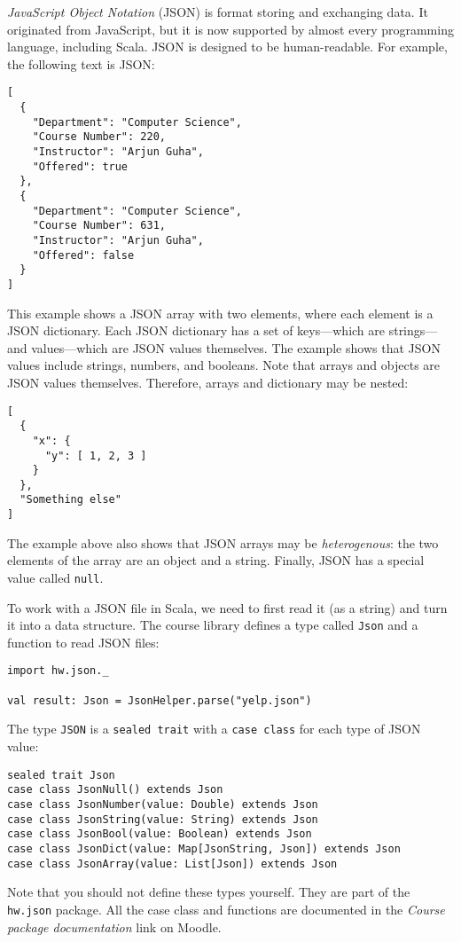 \documentclass[9pt]{extbook}
\begin{document}
\emph{JavaScript Object Notation} (JSON) is format storing and
exchanging data. It originated from JavaScript, but it is now supported by
almost every programming language, including Scala. JSON is designed
to be human-readable. For example, the following text is JSON:
%
\lstset{language=console}
\begin{lstlisting}
[
  {
    "Department": "Computer Science",
    "Course Number": 220,
    "Instructor": "Arjun Guha",
    "Offered": true
  },
  {
    "Department": "Computer Science",
    "Course Number": 631,
    "Instructor": "Arjun Guha",
    "Offered": false
  }
]
\end{lstlisting}
%
This example shows a JSON array with two elements, where each element is a
JSON dictionary. Each JSON dictionary has a set of keys---which are strings---and
values---which are JSON values themselves. The example shows that JSON values include
strings, numbers, and booleans. Note that arrays and objects are JSON values
themselves. Therefore, arrays and dictionary may be nested:
\lstset{language=console}
\begin{lstlisting}
[
  {
    "x": {
      "y": [ 1, 2, 3 ]
    }
  },
  "Something else"
]
\end{lstlisting}
%
The example above also shows that JSON arrays may be \emph{heterogenous}:
the two elements of the array are an object and a string.
Finally, JSON has a special value called \lstinline|null|.

\lstset{language=scala}
To work with a JSON file in Scala, we need to first read it (as a string)
and turn it into a data structure. The course library defines
a type called \lstinline|Json| and a function to read JSON files:
\begin{lstlisting}
import hw.json._

val result: Json = JsonHelper.parse("yelp.json")
\end{lstlisting}
%
The type \lstinline|JSON| is a \lstinline|sealed trait| with a
\lstinline|case class| for each type of JSON value:
\begin{lstlisting}
sealed trait Json
case class JsonNull() extends Json
case class JsonNumber(value: Double) extends Json
case class JsonString(value: String) extends Json
case class JsonBool(value: Boolean) extends Json
case class JsonDict(value: Map[JsonString, Json]) extends Json
case class JsonArray(value: List[Json]) extends Json
\end{lstlisting}

Note that you should not define these types yourself. They are part of the
\lstinline|hw.json| package. All the case class and functions are documented in
the \emph{Course package documentation} link on Moodle.
\end{document}
